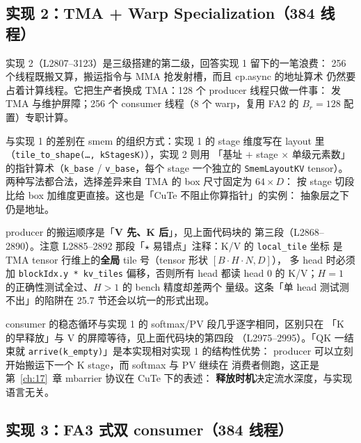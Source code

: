 \subsection{实现 2：TMA + Warp Specialization（384 线程）}

实现 2（L2807--3123）是三级搭建的第二级，回答实现 1 留下的一笔浪费：
256 个线程既搬又算，搬运指令与 MMA 抢发射槽，而且 cp.async 的地址算术
仍然要占着计算线程。它把生产者换成 TMA：128 个 producer 线程只做一件事：
发 TMA 与维护屏障；256 个 consumer 线程（8 个 warp，复用 FA2 的
$B_r{=}128$ 配置）专职计算。



与实现 1 的差别在 smem 的组织方式：实现 1 的 stage 维度写在 layout 里
（\texttt{tile\_\allowbreak{}to\_\allowbreak{}shape\allowbreak{}(\dots,\allowbreak{} k\allowbreak{}Stages\allowbreak{}K)}），实现 2 则用
「基址 $+$ stage $\times$ 单级元素数」的指针算术（\texttt{k\_base} /
\texttt{v\_base}，每个 stage 一个独立的 \texttt{Smem\allowbreak{}Layout\allowbreak{}KV} tensor）。
两种写法都合法，选择差异来自 TMA 的 box 尺寸固定为 $64\times D$：
按 stage 切段比给 box 加维度更直接。这也是「CuTe 不阻止你算指针」的实例：
抽象层之下仍是地址。



producer 的搬运顺序是「\textbf{V 先、K 后}」，见上面代码块的
第三段（L2868--2890）。注意 L2885--2892 那段「$\star$ 易错点」注释：K/V 的 \texttt{local\_tile} 坐标
是 TMA tensor 行维上的\textbf{全局} tile 号（tensor 形状 $[B\!\cdot\!H\!\cdot\!N, D]$），
多 head 时必须加 \texttt{blockIdx.y * kv\_tiles} 偏移，否则所有 head 都读
head 0 的 K/V；$H{=}1$ 的正确性测试全过、$H{>}1$ 的 bench 精度却差两个
量级。这条「单 head 测试测不出」的陷阱在 25.7 节还会以坑一的形式出现。

consumer 的稳态循环与实现 1 的 softmax/PV 段几乎逐字相同，区别只在
「K 的早释放」与 V 的屏障等待，见上面代码块的第四段
（L2975--2995）。「QK 一结束就 \texttt{arrive\allowbreak{}(k\_\allowbreak{}empty)}」是本实现相对实现 1 的结构性优势：
producer 可以立刻开始搬运下一个 K stage，而 softmax 与 PV 继续在
消费者侧跑，这正是第~\ref{ch:17}~章 mbarrier 协议在 CuTe 下的表述：
\textbf{释放时机}决定流水深度，与实现语言无关。

\subsection{实现 3：FA3 式双 consumer（384 线程）}

